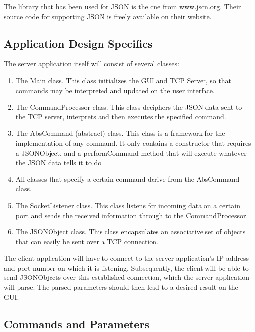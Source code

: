 \documentclass[12pt,a4paper]{article}
\begin{document}
The library that has been used for JSON is the one from www.json.org. Their source code for supporting JSON is freely available on their website.
\subsection{Application Design Specifics}
The server application itself will consist of several classes:
\begin{enumerate}
\item The Main class. This class initializes the GUI and TCP Server, so that commands may be interpreted and updated on the user interface.
\item The CommandProcessor class. This class deciphers the JSON data sent to the TCP server, interprets and then executes the specified command.
\item The AbsCommand (abstract) class. This class is a framework for the implementation of any command. It only contains a constructor that requires a JSONObject, and a performCommand method that will execute whatever the JSON data tells it to do.
\item All classes that specify a certain command derive from the AbsCommand class.
\item The SocketListener class. This class listens for incoming data on a certain port and sends the received information through to the CommandProcessor.
\item The JSONObject class. This class encapsulates an associative set of objects that can easily be sent over a TCP connection.
\end{enumerate}
The client application will have to connect to the server application's IP address and port number on which it is listening. Subsequently, the client will be able to send JSONObjects over this established connection, which the server application will parse. The parsed parameters should then lead to a desired result on the GUI.

\subsection{Commands and Parameters}
\end{document}
